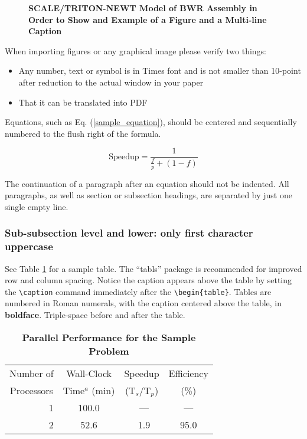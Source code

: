 \documentclass{physor2012}
\begin{document}
\begin{figure}[!htb]
  \centering
  \caption{\bf SCALE/TRITON-NEWT Model of BWR Assembly in Order to Show and Example of a Figure and a Multi-line Caption} 
  \label{fig:amdahl}
\end{figure}

When importing figures or any graphical image please verify two things:
\begin{itemize}
\item Any number, text or symbol is in Times font and is not smaller than 
  10-point after reduction to the actual window in your paper
\item That it can be translated into PDF
\end{itemize}
Equations, such as Eq. (\ref{sample_equation}), should be centered and 
sequentially numbered to the flush right of the formula.

\begin{equation}
  \label{sample_equation}
  \mathrm{Speedup}=\frac{1}{\frac{f}{p}+(1-f)}
\end{equation}

The continuation of a paragraph after an equation should not be indented.  
All paragraphs, as well as section or subsection headings, are separated by 
just one single empty line.
%
\subsubsection{Sub-subsection level and lower: only first character uppercase}
%
See Table \ref{table:example} for a sample table.  The ``tabls'' package is
recommended for improved row and column spacing.  Notice the caption appears 
above the table by setting the \verb!\caption! command immediately 
after the \verb!\begin{table}!. Tables are numbered in Roman 
numerals, with the caption centered above the table, in \textbf{boldface}.  
Triple-space before and after the table.
%
\begin{table}[!htb]
  \centering
  \caption{\bf Parallel Performance for the Sample Problem}
  \label{table:example} 
  \begin{tabular}{||r||c|c|c||} \hline \hline
    \multicolumn{1}{||c||}{Number of} &
    \multicolumn{1}{c|}{Wall-Clock} &
    \multicolumn{1}{c|}{Speedup} &
    \multicolumn{1}{c||}{Efficiency} \\
    \multicolumn{1}{||c||}{Processors} &
    \multicolumn{1}{c|}{Time$^{a}$ (min)} &
    \multicolumn{1}{c|}{(T$_{s}$/T$_{p}$)} &
    \multicolumn{1}{c||}{(\%)} \\ \hline\hline
    \ 1 &  100.0 & \ ---    & ---  \\ \hline
    \ 2 &   52.6 & \ 1.9    & 95.0 \\ \hline \hline
  \end{tabular}
\end{table}
%
\end{document}
